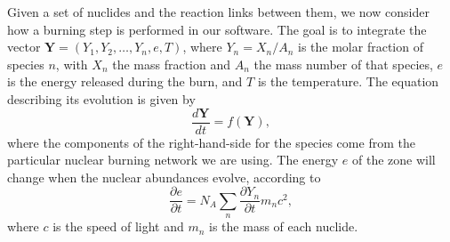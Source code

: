 \documentclass[12pt]{article}
\begin{document}
Given a set of nuclides and the reaction links between them, we now consider
how a burning step is performed in our software. The goal is to integrate the
vector ${\bm{Y}} = (Y_1, Y_2, \ldots, Y_n, e, T)$, where $Y_{n} = X_{n} / A_{n}$
is the molar fraction of species $n$, with $X_n$ the mass fraction and $A_n$ the
mass number of that species, $e$ is the energy released during the burn, and
$T$ is the temperature. The equation describing its evolution is given by
\begin{equation}
  \frac{d\bm{Y}}{dt} = f(\mathbf{Y}),
\end{equation}
where the components of the right-hand-side for the species come from the particular
nuclear burning network we are using. The energy $e$ of the zone
will change when the nuclear abundances evolve, according to
\begin{equation}
  \frac{\partial e}{\partial t} = N_A \sum_{n} \frac{\partial Y_{n}}{\partial t} m_{n} c^2,
\end{equation}
where $c$ is the speed of light and $m_n$ is the mass of each nuclide.
\end{document}
